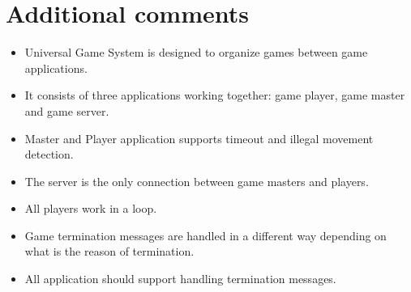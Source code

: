 \documentclass{article}
\begin{document}
\section{Additional comments}
\begin{itemize}
  \item Universal Game System is designed to organize games between game applications.
  \item It consists of three applications working together: game player, game master and game server.
  \item Master and Player application supports timeout and illegal movement detection.
  \item The server is the only connection between game masters and players.
  \item All players work in a loop.
  \item Game termination messages are handled in a different way depending on what is the reason of termination.
  \item All application should support handling termination messages.
\end{itemize}
\end{document}
